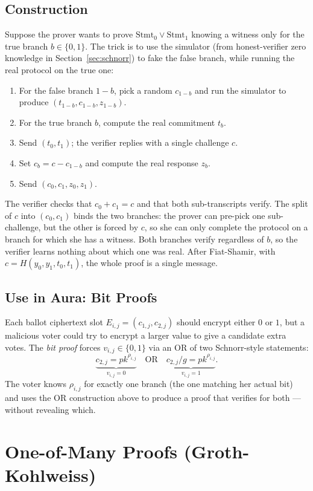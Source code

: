 \documentclass[12pt,a4paper,oneside]{report}
\begin{document}
\subsection*{Construction}
Suppose the prover wants to prove $\text{Stmt}_0 \lor \text{Stmt}_1$ 
knowing a witness only for the true branch $b \in \{0, 1\}$. The trick is 
to use the simulator (from honest-verifier zero knowledge in 
Section~\ref{sec:schnorr}) to fake the false branch, while running the 
real protocol on the true one:
\begin{enumerate}
    \item For the false branch $1 - b$, pick a random $c_{1-b}$ and run 
    the simulator to produce $(t_{1-b}, c_{1-b}, z_{1-b})$.
    \item For the true branch $b$, compute the real commitment $t_b$.
    \item Send $(t_0, t_1)$; the verifier replies with a single challenge 
    $c$.
    \item Set $c_b = c - c_{1-b}$ and compute the real response $z_b$.
    \item Send $(c_0, c_1, z_0, z_1)$.
\end{enumerate}
The verifier checks that $c_0 + c_1 = c$ and that both sub-transcripts 
verify. The split of $c$ into $(c_0, c_1)$ binds the two branches: the 
prover can pre-pick one sub-challenge, but the other is forced by $c$, 
so she can only complete the protocol on a branch for which she has a 
witness. Both branches verify regardless of $b$, so the verifier learns 
nothing about which one was real. After Fiat-Shamir, with 
$c = H(y_0, y_1, t_0, t_1)$, the whole proof is a single message.

\subsection*{Use in Aura: Bit Proofs}
Each ballot ciphertext slot $E_{i,j} = (c_{1,j}, c_{2,j})$ should encrypt 
either $0$ or $1$, but a malicious voter could try to encrypt a larger 
value to give a candidate extra votes. The \textit{bit proof} forces 
$v_{i,j} \in \{0, 1\}$ via an OR of two Schnorr-style statements:
\[
    \underbrace{c_{2,j} = pk^{\rho_{i,j}}}_{v_{i,j} = 0}
    \quad \text{OR} \quad
    \underbrace{c_{2,j} / g = pk^{\rho_{i,j}}}_{v_{i,j} = 1}.
\]
The voter knows $\rho_{i,j}$ for exactly one branch (the one matching 
her actual bit) and uses the OR construction above to produce a proof 
that verifies for both --- without revealing which.
\section{One-of-Many Proofs (Groth-Kohlweiss)}
\label{sec:one-of-many}
\end{document}
